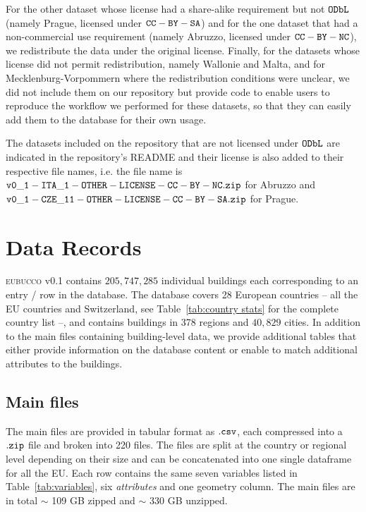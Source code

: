 \documentclass[fleqn,10pt]{wlscirep}
\begin{document}
For the other dataset whose license had a share-alike requirement but not ${\tt ODbL}$ (namely Prague, licensed under ${\tt CC-BY-SA}$) and for the one dataset that had a non-commercial use requirement (namely Abruzzo, licensed under ${\tt CC-BY-NC}$), we redistribute the data under the original license. Finally, for the datasets whose license did not permit redistribution, namely Wallonie and Malta, and for Mecklenburg-Vorpommern where the redistribution conditions were unclear, we did not include them on our repository but provide code to enable users to reproduce the workflow we performed for these datasets, so that they can easily add them to the database for their own usage. 

The datasets included on the repository that are not licensed under ${\tt ODbL}$ are indicated in the repository's README and their license is also added to their respective file names, i.e. the file name is ${\tt v0\_1-ITA\_1-OTHER-LICENSE-CC-BY-NC.zip}$ for Abruzzo and ${\tt v0\_1-CZE\_11-OTHER-LICENSE-CC-BY-SA.zip}$ for Prague.


\section*{Data Records}

\textsc{eubucco} v0.1 contains $205, 747, 285$ individual buildings each corresponding to an entry / row in the database. The database covers 28 European countries -- all the EU countries and Switzerland, see Table~\ref{tab:country stats} for the complete country list --, and contains buildings in 378 regions and $40,829$ cities. In addition to the main files containing building-level data, we provide additional tables that either provide information on the database content or enable to match additional attributes to the buildings.

\subsection*{Main files}
The main files are provided in tabular format as $\tt{.csv}$, each compressed into a $\tt{.zip}$ file and broken into 220 files. The files are split at the country or regional level depending on their size and can be concatenated into one single dataframe for all the EU. Each row contains the same seven variables listed in Table~\ref{tab:variables}, six \textit{attributes} and one geometry column. The main files are in total $\sim$ 109 GB zipped and $\sim$ 330 GB unzipped.
\end{document}
